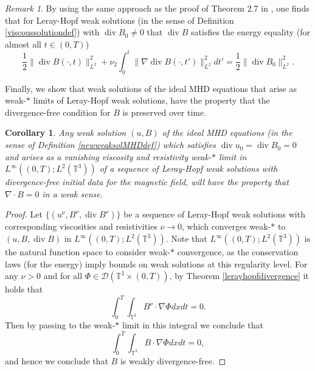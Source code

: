\documentclass[12pt,a4paper]{article}
\newtheorem{corollary}[theorem]{Corollary}
\theoremstyle{definition}
\theoremstyle{remark}
\newtheorem{remark}[theorem]{Remark}
\numberwithin{equation}{section}
\DeclareMathOperator{\Div}{div}
\begin{document}
\begin{remark}
By using the same approach as the proof of Theorem 2.7 in \cite{bonicatto2023}, one finds that for Leray-Hopf weak solutions (in the sense of Definition \ref{viscoussolutiondef}) with $\Div B_0 \neq 0$ that $\Div B$ satisfies the energy equality (for almost all $t \in (0,T)$)
\begin{equation}
\frac{1}{2} \lVert \Div B (\cdot, t) \rVert_{L^2}^2 + \nu_2 \int_0^t \lVert \nabla \Div B (\cdot, t') \rVert_{L^2}^2 dt' = \frac{1}{2} \lVert \Div B_0 \rVert_{L^2}^2.
\end{equation}
\end{remark}
Finally, we show that weak solutions of the ideal MHD equations that arise as weak-$*$ limits of Leray-Hopf weak solutions, have the property that the divergence-free condition for $B$ is preserved over time.
\begin{corollary} \label{viscositylimitcorollary}
Any weak solution $(u,B)$ of the ideal MHD equations (in the sense of Definition \ref{newweaksolMHDdef}) which satisfies $\Div u_0 = \Div B_0 = 0$ and arises as a vanishing viscosity and resistivity weak-$*$ limit in $L^\infty ((0,T); L^2 (\mathbb{T}^3))$ of a sequence of Leray-Hopf weak solutions with divergence-free initial data for the magnetic field, will have the property that $\nabla \cdot B = 0$ in a weak sense. 
\end{corollary}
\begin{proof}
Let $\{ (u^\nu, B^\nu, \Div B^\nu ) \}$ be a sequence of Leray-Hopf weak solutions with corresponding viscosities and resistivities $\nu \rightarrow 0$, which converges weak-$*$ to $(u, B, \Div B)$ in $L^\infty ((0,T); L^2 (\mathbb{T}^3))$. Note that $L^\infty ((0,T); L^2 (\mathbb{T}^3))$ is the natural function space to consider weak-$*$ convergence, as the conservation laws (for the energy) imply bounds on weak solutions at this regularity level. For any $\nu > 0$ and for all $\Phi \in \mathcal{D} (\mathbb{T}^3 \times (0,T))$, by Theorem \ref{lerayhopfdivergence} it holds that
\begin{equation*}
\int_0^T \int_{\mathbb{T}^3} B^\nu \cdot \nabla \Phi dx dt = 0.
\end{equation*}
Then by passing to the weak-$*$ limit in this integral we conclude that
\begin{equation*}
\int_0^T \int_{\mathbb{T}^3} B \cdot \nabla \Phi dx dt = 0,
\end{equation*}
and hence we conclude that $B$ is weakly divergence-free. 
\end{proof}
\end{document}
